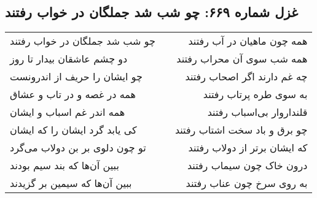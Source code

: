 \begin{center}
\section*{غزل شماره ۶۶۹: چو شب شد جملگان در خواب رفتند}
\label{sec:0669}
\begin{longtable}{l p{0.5cm} r}
چو شب شد جملگان در خواب رفتند
&&
همه چون ماهیان در آب رفتند
\\
دو چشم عاشقان بیدار تا روز
&&
همه شب سوی آن محراب رفتند
\\
چو ایشان را حریف از اندرونست
&&
چه غم دارند اگر اصحاب رفتند
\\
همه در غصه و در تاب و عشاق
&&
به سوی طره پرتاب رفتند
\\
همه اندر غم اسباب و ایشان
&&
قلنداروار بی‌اسباب رفتند
\\
کی یابد گرد ایشان را که ایشان
&&
چو برق و باد سخت اشتاب رفتند
\\
تو چون دلوی بر بن دولاب می‌گرد
&&
که ایشان برتر از دولاب رفتند
\\
ببین آن‌ها که بند سیم بودند
&&
درون خاک چون سیماب رفتند
\\
ببین آن‌ها که سیمین بر گزیدند
&&
به روی سرخ چون عناب رفتند
\\
\end{longtable}
\end{center}
